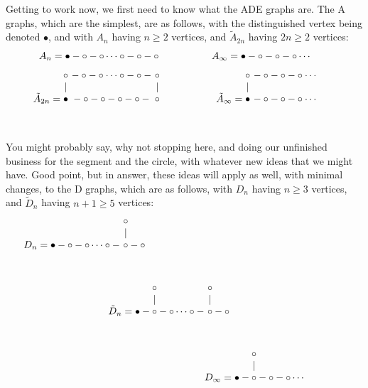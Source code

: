 \documentclass[12pt]{amsbook}
\begin{document}
Getting to work now, we first need to know what the ADE graphs are. The A graphs, which are the simplest, are as follows, with the distinguished vertex being denoted $\bullet$, and with $A_n$ having $n\geq2$ vertices, and $\tilde{A}_{2n}$ having $2n\geq2$ vertices:
$$A_n=\bullet-\circ-\circ\cdots\circ-\circ-\circ\hskip18mm 
A_{\infty}=\bullet-\circ-\circ-\circ\cdots\hskip7mm$$
\vskip-3mm
$$\ \ \ \ \ \ \ \tilde{A}_{2n}=
\begin{matrix}
\circ&\!\!\!\!-\circ-\circ\cdots\circ-\circ-&\!\!\!\!\circ\\
|&&\!\!\!\!|\\
\bullet&\!\!\!\!-\circ-\circ-\circ-\circ-&\!\!\!\!\circ\\
\\
\\
\end{matrix}\hskip20mm 
\tilde{A}_\infty=
\begin{matrix}
\circ&\!\!\!\!-\circ-\circ-\circ\cdots\\
|&\\
\bullet&\!\!\!\!-\circ-\circ-\circ\cdots\\
\\
\\
\end{matrix}
\hskip15mm$$
\vskip-7mm

You might probably say, why not stopping here, and doing our unfinished business for the segment and the circle, with whatever new ideas that we might have. Good point, but in answer, these ideas will apply as well, with minimal changes, to the D graphs, which are as follows, with $D_n$ having $n\geq3$ vertices, and $\tilde{D}_n$ having $n+1\geq5$ vertices:
$$D_n=\bullet-\circ-\circ\dots\circ-
\begin{matrix}\ \circ\\
\ |\\
\ \circ \\
\ \\
\  \end{matrix}-\circ\hskip71mm$$
\vskip-7mm
$$\hskip7mm\tilde{D}_n=\bullet-
\begin{matrix}\circ\\
|\\
\circ\\
\ \\
\ \end{matrix}-\circ\dots\circ-
\begin{matrix}\ \circ\\
\ |\\
\ \circ \\
\ \\
\  \end{matrix}-\circ\hskip18mm$$
\vskip-7mm
$$\hskip50mm D_\infty=\bullet-
\begin{matrix}\circ\\
|\\
\circ\\
\ \\
\ \end{matrix}-\circ-\circ\cdots$$
\vskip-7mm
\end{document}
